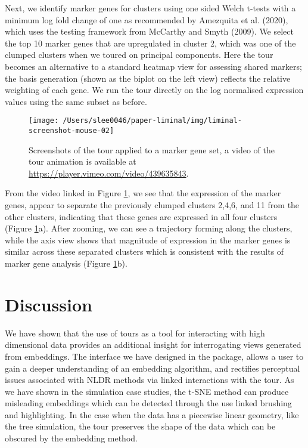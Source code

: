 \documentclass[article,notitle]{jdssv}
\begin{document}
Next, we identify marker genes for clusters using one sided Welch t-tests with
a minimum log fold change of one as recommended by Amezquita et al. (2020), which
uses the testing framework from McCarthy and Smyth (2009). We select the top 10 marker
genes that are upregulated in cluster 2, which was one of the clumped clusters
when we toured on principal components. Here the tour becomes an alternative
to a standard heatmap view for assessing shared markers; the basis
generation (shown as the biplot on the left view) reflects the relative
weighting of each gene. We run the tour directly on the
log normalised expression values using the same subset as before.



\begin{figure}

{\centering \texttt{[image: /Users/slee0046/paper-liminal/img/liminal-screenshot-mouse-02]} 

}

\caption{Screenshots of the  tour applied to a marker gene set, a video of the tour animation is available at \url{https://player.vimeo.com/video/439635843}.}\label{fig:mouse-02}
\end{figure}

From the video linked in Figure \ref{fig:mouse-02}, we see that the
expression of the marker genes, appear to separate
the previously clumped clusters 2,4,6, and 11 from the other clusters,
indicating that these genes are expressed in all four clusters (Figure \ref{fig:mouse-02}a). After zooming, we can see a trajectory forming along
the clusters, while the axis view shows that magnitude of expression in
the marker genes is similar across these separated clusters which is
consistent with the results of marker gene analysis (Figure \ref{fig:mouse-02}b).

\hypertarget{discussion}{%
\section{Discussion}\label{discussion}}

We have shown that the use of tours as a tool for interacting with
high dimensional data provides an additional insight for interrogating views
generated from embeddings. The interface we have designed in the 
package, allows a user to gain a deeper understanding of an embedding
algorithm, and rectifies perceptual issues associated with NLDR methods via
linked interactions with the tour. As we have shown in the simulation case
studies, the t-SNE method can produce misleading embeddings which can be
detected through the use linked brushing and highlighting. In the case when
the data has a piecewise linear geometry, like the tree simulation, the tour
preserves the shape of the data which can be obscured by the embedding method.
\end{document}
